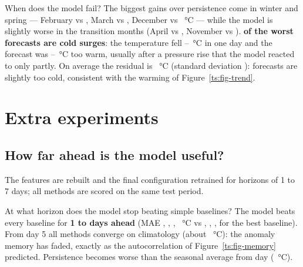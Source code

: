 \begin{table}[H]\centering\small
\caption{Test MAE by month (bold = final model better than persistence).}\label{ts:tab-months}
\footnotesize\setlength{\tabcolsep}{3.6pt}

\end{table}

\begin{table}[H]\centering\small
\caption{The \TSWorstN{} largest test errors (°C; pressure change on the forecast day in hPa).}\label{ts:tab-worst}

\end{table}
\begin{finding}
\Q When does the model fail?
\F The biggest gains over persistence come in winter and spring — February \TSMoFebModel{} vs \TSMoFebPersist, March
\TSMoMarModel{} vs \TSMoMarPersist, December \TSMoDecModel{} vs \TSMoDecPersist~°C — while the model is slightly worse in the
transition months (April \TSMoAprModel{} vs \TSMoAprPersist, November \TSMoNovModel{} vs \TSMoNovPersist). \textbf{\TSWorstCold{} of
the \TSWorstN{} worst forecasts are cold surges}: the temperature fell \TSWorstDropMin–\TSWorstDropMax~°C in one day and the
forecast was \TSWorstErrMin–\TSWorstErrMax~°C too warm, usually after a pressure rise that the model reacted to only partly. On
average the residual is \TSResMean~°C (standard deviation \TSResStd): forecasts are slightly too cold, consistent with the
warming of Figure~\ref{ts:fig-trend}.
\end{finding}

\section{Extra experiments}\label{ts:extra}
\subsection{How far ahead is the model useful?}
The features are rebuilt and the final configuration retrained for horizons of 1 to 7 days; all methods are scored on the same
test period.

\begin{table}[H]\centering\small
\caption{Test MAE (°C) by forecast horizon (best per horizon in bold).}\label{ts:tab-horizon}

\end{table}
\begin{finding}
\Q At what horizon does the model stop beating simple baselines?
\F The model beats every baseline for \textbf{1 to \TSUseful{} days ahead} (MAE \TSHOne, \TSHTwo, \TSHThree, \TSHFour~°C vs
\TSHOneBase, \TSHTwoBase, \TSHThreeBase, \TSHFourBase{} for the best baseline). From day 5 all methods converge on climatology
(about \TSClim~°C): the anomaly memory has faded, exactly as the autocorrelation of Figure~\ref{ts:fig-memory} predicted.
Persistence becomes worse than the seasonal average from day \TSPersistCross{} (\TSPersistCrossMae~°C).
\end{finding}


